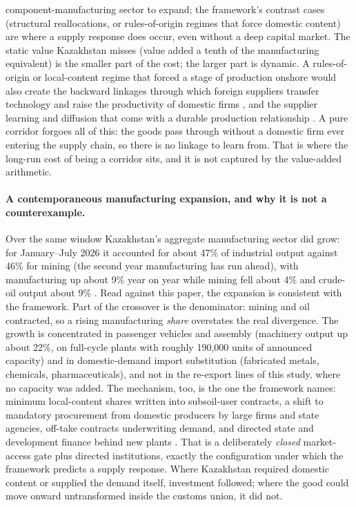 \documentclass[12pt]{article}
\begin{document}
component-manufacturing sector to expand; the framework's contrast cases (structural
reallocations, or rules-of-origin regimes that force domestic content) are where a supply
response does occur, even without a deep capital market. The static value Kazakhstan
misses (value added a tenth of the manufacturing equivalent) is the smaller part of the cost;
the larger part is dynamic. A rules-of-origin or local-content
regime that forced a stage of production onshore would also create the backward linkages
through which foreign suppliers transfer technology and raise the productivity of domestic
firms \citep{javorcik2004spillovers}, and the supplier learning and diffusion that come with a
durable production relationship \citep{desouza2024diffusion}. A pure corridor forgoes all of
this: the goods pass through without a domestic firm ever entering the supply chain, so there
is no linkage to learn from. That is where the long-run cost of being a corridor sits, and it
is not captured by the value-added arithmetic.

\paragraph{A contemporaneous manufacturing expansion, and why it is not a counterexample.}
Over the same window Kazakhstan's aggregate manufacturing sector did grow: for January--July
2026 it accounted for about 47\% of industrial output against 46\% for mining (the second
year manufacturing has run ahead), with manufacturing up about 9\% year on year while mining
fell about 4\% and crude-oil output about 9\% \citep{qazstat2026industry}. Read against this
paper, the expansion is consistent with the framework. Part of the crossover is the denominator: mining
and oil contracted, so a rising manufacturing \emph{share} overstates the real divergence. The
growth is concentrated in passenger vehicles and assembly (machinery output up about 22\%, on
full-cycle plants with roughly 190{,}000 units of announced capacity) and in domestic-demand
import substitution (fabricated metals, chemicals, pharmaceuticals), and not in the re-export
lines of this study, where no capacity was added. The mechanism, too, is the one the
framework names: minimum local-content shares written into subsoil-user contracts, a shift to
mandatory procurement from domestic producers by large firms and state agencies, off-take
contracts underwriting demand, and directed state and development finance behind new plants
\citep{kzgov2026domprod,eaeu2014treaty}. That is a deliberately \emph{closed} market-access
gate plus directed institutions, exactly the configuration under which the framework predicts a
supply response. Where Kazakhstan required domestic content or supplied the demand itself,
investment followed; where the good could move onward untransformed inside the customs union,
it did not.
\end{document}

